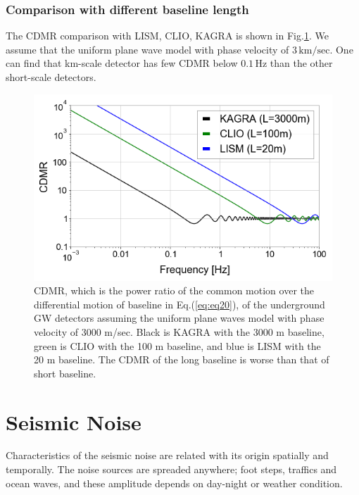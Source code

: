 \subsubsection{Comparison with different baseline length}
The CDMR comparison with LISM, CLIO, KAGRA is shown in Fig.\ref{img:img301}. We assume that the uniform plane wave model with phase velocity of $3\,\mathrm{km/sec}$. One can find that km-scale detector has few CDMR below $0.1\,\mathrm{Hz}$ than the other short-scale detectors. 



\begin{figure}[p]
  \begin{center}
    \centering
    \includegraphics[width=12cm]{./img_chap3/img329.png}
    \caption{CDMR, which is the power ratio of the common motion over the differential motion of baseline in Eq.(\ref{eq:eq20}), of the underground GW detectors assuming the uniform plane waves model with phase velocity of 3000 m/sec. Black is KAGRA with the 3000 m baseline, green is CLIO with the 100 m baseline, and blue is LISM with the 20 m baseline. The CDMR of the long baseline is worse than that of short baseline.}\label{img:img301}
    \centering      
  \end{center}
\end{figure}


\newpage
\section{Seismic Noise}\label{sec:32}
Characteristics of the seismic noise are related with its origin spatially and temporally. The noise sources are spreaded anywhere; foot steps, traffics and ocean waves, and these amplitude depends on day-night or weather condition.

